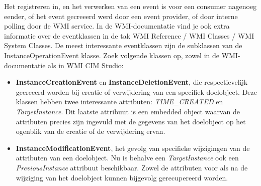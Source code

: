 \documentclass[11pt,a4paper]{report}
\begin{document}
\par Het registreren in, en het verwerken van een event is voor een consumer nagenoeg eender, of het event gecreeerd werd door een event provider, of door interne polling door de WMI service. In de WMI-documentatie vind je ook extra informatie over de eventklassen in de tak WMI Reference / WMI Classes / WMI System Classes.
De meest interessante eventklassen zijn de subklassen van de InstanceOperationEvent klasse. Zoek volgende klassen op, zowel in de WMI-documentatie als in WMI CIM Studio:
\begin{itemize}
	\item \textbf{InstanceCreationEvent} en \textbf{InstanceDeletionEvent}, die respectievelijk gecreeerd worden bij creatie of verwijdering van een specifiek doelobject. Deze klassen hebben twee interessante attributen: \textit{TIME\_CREATED} en \textit{TargetInstance}. Dit laatste attribuut is een embedded object waarvan de attributen precies zijn ingevuld met de gegevens van het doelobject op het ogenblik van de creatie of de verwijdering ervan.
	\item \textbf{InstanceModificationEvent}, het gevolg van specifieke wijzigingen van de attributen van een doelobject. Nu is behalve een \textit{TargetInstance} ook een \textit{PreviousInstance} attribuut beschikbaar. Zowel de attributen voor als na de wijziging van het doelobject kunnen bijgevolg gerecupereerd worden.
\end{itemize}
\end{document}
